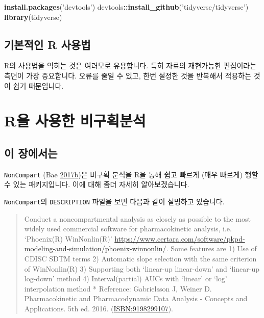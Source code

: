 \documentclass[12pt,]{krantz}
\newenvironment{Shaded}{\begin{snugshade}}{\end{snugshade}}
\newcommand{\KeywordTok}[1]{\textcolor[rgb]{0.13,0.29,0.53}{\textbf{#1}}}
\newcommand{\StringTok}[1]{\textcolor[rgb]{0.31,0.60,0.02}{#1}}
\newcommand{\OperatorTok}[1]{\textcolor[rgb]{0.81,0.36,0.00}{\textbf{#1}}}
\newcommand{\NormalTok}[1]{#1}
\theoremstyle{definition}
\theoremstyle{definition}
\theoremstyle{definition}
\theoremstyle{remark}
\begin{document}
\begin{Shaded}
\begin{Highlighting}[]
\KeywordTok{install.packages}\NormalTok{(}\StringTok{'devtools'}\NormalTok{)}
\NormalTok{devtools}\OperatorTok{::}\KeywordTok{install_github}\NormalTok{(}\StringTok{'tidyverse/tidyverse'}\NormalTok{)}
\KeywordTok{library}\NormalTok{(tidyverse)}
\end{Highlighting}
\end{Shaded}

\section{기본적인 R 사용법}\label{basic}

R의 사용법을 익히는 것은 여러모로 유용합니다. 특히 자료의 재현가능한
편집이라는 측면이 가장 중요합니다. 오류를 줄일 수 있고, 한번 설정한 것을
반복해서 적용하는 것이 쉽기 때문입니다.

\chapter{R을 사용한 비구획분석}\label{noncompart}

\section{이 장에서는}\label{summary-noncompart}

\texttt{NonCompart} (Bae
\protect\hyperlink{ref-R-NonCompart}{2017}\protect\hyperlink{ref-R-NonCompart}{b})은
비구획 분석을 R을 통해 쉽고 빠르게 (매우 빠르게) 행할 수 있는
패키지입니다. 이에 대해 좀더 자세히 알아보겠습니다.

\texttt{NonCompart}의 \texttt{DESCRIPTION} 파일을 보면 다음과 같이
설명하고 있습니다.

\begin{quote}
Conduct a noncompartmental analysis as closely as possible to the most
widely used commercial software for pharmacokinetic analysis, i.e.
`Phoenix(R) WinNonlin(R)'
\url{https://www.certara.com/software/pkpd-modeling-and-simulation/phoenix-winnonlin/}.
Some features are 1) Use of CDISC SDTM terms 2) Automatic slope
selection with the same criterion of WinNonlin(R) 3) Supporting both
`linear-up linear-down' and `linear-up log-down' method 4)
Interval(partial) AUCs with `linear' or `log' interpolation method *
Reference: Gabrielsson J, Weiner D. Pharmacokinetic and Pharmacodynamic
Data Analysis - Concepts and Applications. 5th ed. 2016.
(\url{ISBN:9198299107}).
\end{quote}
\end{document}
